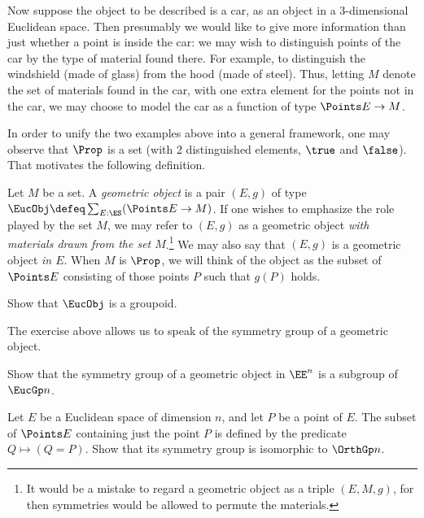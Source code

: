 Now suppose the object to be described is a car, as an object in a
3-dimensional Euclidean space.  Then presumably we would like to give more
information than just whether a point is inside the car: we may wish to
distinguish points of the car by the type of material found there.  For
example, to distinguish the windshield (made of glass) from the hood (made of
steel).  Thus, letting $M$ denote the set of materials found in the car, with
one extra element for the points not in the car, we may choose to model the car
as a function of type $\Points E \to M$.

In order to unify the two examples above into a general framework, one may
observe that $\Prop$ is a set (with 2 distinguished elements, $\true$ and
$\false$).  That motivates the following definition.

\begin{definition}
  Let $M$ be a set.  A {\em geometric object} is a pair $(E,g)$ of type
  $\EucObj \defeq \sum_{E:\ES} (\Points E \to M)$.  If one wishes to emphasize
  the role played by the set $M$, we may refer to $(E,g)$ as a geometric object
  {\em with materials drawn from the set $M$}.\footnote{It would be a mistake
    to regard a geometric object as a triple $(E,M,g)$, for then symmetries
    would be allowed to permute the materials.}  We may also say that $(E,g)$
  is a geometric object {\em in $E$}.  When $M$ is $\Prop$, we will think of
  the object as the subset of $\Points E$ consisting of those points $P$ such
  that $g(P)$ holds.
\end{definition}

\begin{exercise}
  Show that $\EucObj$ is a groupoid.
\end{exercise}

The exercise above allows us to speak of the symmetry group of a geometric object.

\begin{exercise}
  Show that the symmetry group of a geometric object in $\EE^n$ is a subgroup of $\EucGp n$.
\end{exercise}

\begin{exercise}
  Let $E$ be a Euclidean space of dimension $n$, and let $P$ be a point of $E$.
  The subset of $\Points E$ containing just the point $P$ is defined by the
  predicate $Q \mapsto (Q=P)$.  Show that its symmetry group is isomorphic to
  $\OrthGp n$.
\end{exercise}

